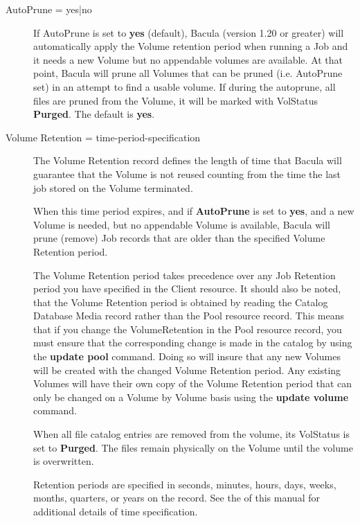\begin{description}

\item [AutoPrune = \lt{}yes|no\gt{}]
   If AutoPrune is set to  {\bf yes} (default), Bacula (version 1.20 or greater)
will  automatically apply the Volume retention period when running a Job  and
it needs a new Volume but no appendable volumes are available.  At that point,
Bacula will prune all Volumes that can be pruned  (i.e. AutoPrune set) in an
attempt to find a usable volume. If  during the autoprune, all files are
pruned from the Volume, it  will be marked with VolStatus {\bf Purged}.  The
default is {\bf yes}.  

\item [Volume Retention = \lt{}time-period-specification\gt{}]
   The  Volume Retention record defines the length of time that  Bacula will
guarantee that the Volume is not reused counting  from the time the last job
stored on the Volume terminated.  

When this time period expires, and if {\bf AutoPrune} is set to  {\bf yes},
and a new Volume is needed, but no appendable Volume  is available, Bacula
will prune (remove) Job records that  are older than the specified Volume
Retention period.  

The Volume Retention period takes precedence  over any Job Retention period
you have specified in the  Client resource. It should also be noted, that the
Volume  Retention period is obtained by reading the Catalog Database Media 
record rather than the Pool resource record. This means that  if you change
the VolumeRetention in the Pool resource record,  you must ensure that the
corresponding change is made in the  catalog by using the {\bf update pool}
command. Doing so  will insure that any new Volumes will be created with the 
changed Volume Retention period. Any existing Volumes will  have their own
copy of the Volume Retention period that can  only be changed on a Volume by
Volume basis using the  {\bf update volume} command.  

When all file catalog entries are removed from the volume,  its VolStatus is
set to {\bf Purged}. The files remain physically  on the Volume until the
volume is overwritten.  

Retention periods are specified in seconds,  minutes, hours, days, weeks,
months,  quarters, or years on the record. See the  
 of this  manual for
additional details of time specification.  


\end{description}
